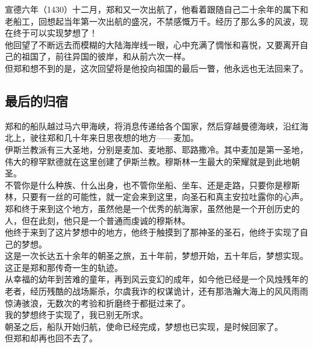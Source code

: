 \begin{multicols}{\theparacolNo}
宣德六年（1430）十二月，郑和又一次出航了，他看着跟随自己二十余年的属下和老船工，回想起当年第一次出航的盛况，不禁感慨万千。经历了那么多的风波，现在终于可以实现梦想了！\\

他回望了不断远去而模糊的大陆海岸线一眼，心中充满了惆怅和喜悦，又要离开自己的祖国了，前往异国的彼岸，和从前六次一样。\\

但郑和想不到的是，这次回望将是他投向祖国的最后一瞥，他永远也无法回来了。\\

\subsection{最后的归宿}
郑和的船队越过马六甲海峡，将消息传递给各个国家，然后穿越曼德海峡，沿红海北上，驶往郑和几十年来日思夜想的地方——麦加。\\

伊斯兰教派有三大圣地，分别是麦加、麦地那、耶路撒冷。其中麦加是第一圣地，伟大的穆罕默德就在这里创建了伊斯兰教。穆斯林一生最大的荣耀就是到此地朝圣。\\

不管你是什么种族、什么出身，也不管你坐船、坐车、还是走路，只要你是穆斯林，只要有一丝的可能性，就一定会来到这里，向圣石和真主安拉吐露你的心声。\\

郑和终于来到这个地方，虽然他是一个优秀的航海家，虽然他是一个开创历史的人，但在此刻，他只是一个普通而虔诚的穆斯林。\\

他终于来到了这片梦想中的地方，他终于触摸到了那神圣的圣石，他终于实现了自己的梦想。\\

这是一次长达五十余年的朝圣之旅，五十年前，梦想开始，五十年后，梦想实现。这正是郑和那传奇一生的轨迹。\\

从幸福的幼年到苦难的童年，再到风云变幻的成年，如今他已经是一个风烛残年的老者，经历残酷的战场厮杀，尔虞我诈的权谋诡计，还有那浩瀚大海上的风风雨雨惊涛骇浪，无数次的考验和折磨终于都挺过来了。\\

我的梦想终于实现了，我已别无所求。\\

朝圣之后，船队开始归航，使命已经完成，梦想也已实现，是时候回家了。\\

但郑和却再也回不去了。\\


\end{multicols}
